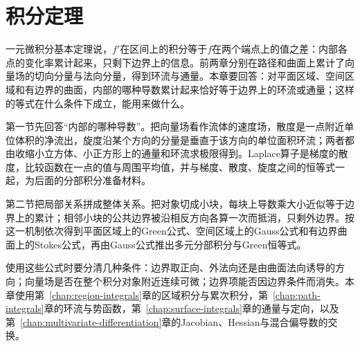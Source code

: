 \chapter{积分定理}
\label{chap:integral-theorems}

一元微积分基本定理说，$f'$在区间上的积分等于$f$在两个端点上的值之差：内部各点的变化率累计起来，只剩下边界上的信息。前两章分别在路径和曲面上累计了向量场的切向分量与法向分量，得到环流与通量。本章要回答：对平面区域、空间区域和有边界的曲面，内部的哪种导数累计起来恰好等于边界上的环流或通量；这样的等式在什么条件下成立，能用来做什么。

第一节先回答“内部的哪种导数”。把向量场看作流体的速度场，散度是一点附近单位体积的净流出，旋度沿某个方向的分量是垂直于该方向的单位面积环流；两者都由收缩小立方体、小正方形上的通量和环流求极限得到。Laplace算子是梯度的散度，比较函数在一点的值与周围平均值，并与梯度、散度、旋度之间的恒等式一起，为后面的分部积分准备材料。

第二节把局部关系拼成整体关系。把对象切成小块，每块上导数乘大小近似等于边界上的累计；相邻小块的公共边界被沿相反方向各算一次而抵消，只剩外边界。按这一机制依次得到平面区域上的Green公式、空间区域上的Gauss公式和有边界曲面上的Stokes公式，再由Gauss公式推出多元分部积分与Green恒等式。

使用这些公式时要分清几种条件：边界取正向、外法向还是由曲面法向诱导的方向；向量场是否在整个积分对象附近连续可微；边界项能否因边界条件而消失。本章使用第~\ref{chap:region-integrals}章的区域积分与累次积分，第~\ref{chap:path-integrals}章的环流与势函数，第~\ref{chap:surface-integrals}章的通量与定向，以及第~\ref{chap:multivariate-differentiation}章的Jacobian、Hessian与混合偏导数的交换。



